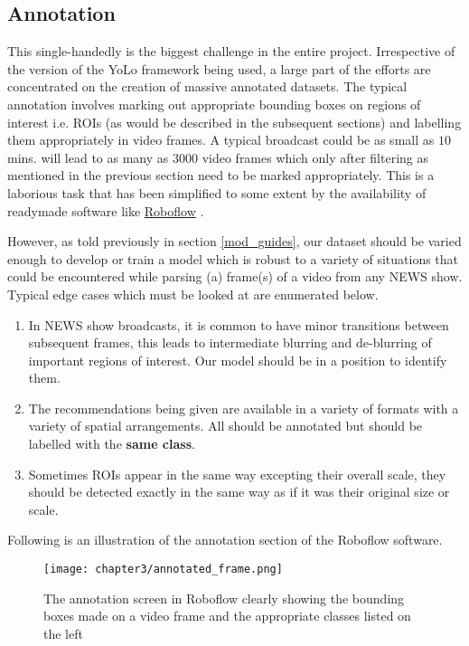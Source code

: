 \subsection{Annotation}
This single-handedly is the biggest challenge in the entire project. Irrespective of the version of the YoLo framework being used, a large part of the efforts are concentrated on the creation of massive annotated datasets. The typical annotation involves marking out appropriate bounding boxes on regions of interest i.e. ROIs (as would be described in the subsequent sections) and labelling them appropriately in video frames. A typical broadcast could be as small as $10$ mins. will lead to as many as $3000$ video frames which only after filtering as mentioned in the previous section need to be marked appropriately. This is a laborious task that has been simplified to some extent by the availability of readymade software like \href{https://roboflow.com/annotate}{Roboflow} \cite{rb2022}. \par

However, as told previously in section \ref{mod_guides}, our dataset should be varied enough to develop or train a model which is robust to a variety of situations that could be encountered while parsing (a) frame(s) of a video from any NEWS show. Typical edge cases which must be looked at are enumerated below.
\begin{enumerate}
  \item In NEWS show broadcasts, it is common to have minor transitions between subsequent frames, this leads to intermediate blurring and de-blurring of important regions of interest. Our model should be in a position to identify them.
  \item The recommendations being given are available in a variety of formats with a variety of spatial arrangements. All should be annotated but should be labelled with the \textbf{same class}.
  \item Sometimes ROIs appear in the same way excepting their overall scale, they should be detected exactly in the same way as if it was their original size or scale.
\end{enumerate}
Following is an illustration of the annotation section of the Roboflow software.

\begin{figure}[h]
  \centering
  \texttt{[image: chapter3/annotated\_frame.png]}
  \caption{The annotation screen in Roboflow clearly showing the bounding boxes made on a video frame and the appropriate classes listed on the left}
  \label{fig:annot_frame}
\end{figure}

